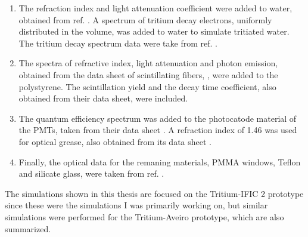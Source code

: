 \begin{enumerate}
%
\item{} The refraction index and light attenuation coefficient were added to water, obtained from ref. \cite{WaterPropertiesSimulation}. A spectrum of tritium decay electrons, uniformly distributed in the volume, was added to water to simulate tritiated water. The tritium decay spectrum data were take from ref. \cite{TritiumEmissionSpectrum}.

\item{} The spectra of refractive index, light attenuation and photon emission, obtained from the data sheet of scintillating fibers, \cite{DataSheetBCF12Fiber}, were added to the polystyrene. The scintillation yield and the decay time coefficient, also obtained from their data sheet, were included.

\item{} The quantum efficiency spectrum was added to the photocatode material of the PMTs, taken from their data sheet \cite{DataSheetPMTs}. A refraction index of 1.46 was used for optical grease, also obtained from its data sheet \cite{OpticalGrease}.

\item{} Finally, the optical data for the remaning materials, PMMA windows, Teflon and silicate glass, were taken from ref. \cite{NEMODataSimulation}.

\end{enumerate} 

The simulations shown in this thesis are focused on the Tritium-IFIC 2 prototype since these were the simulations I was primarily working on, but similar simulations were performed for the Tritium-Aveiro prototype, which are also summarized.
